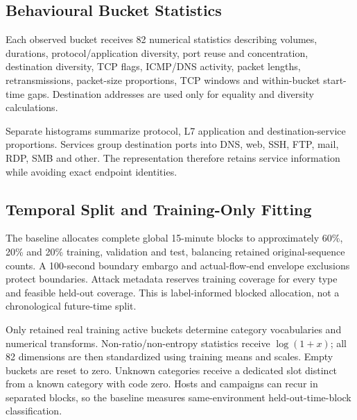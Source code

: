 \documentclass[conference]{IEEEtran}
\begin{document}
\subsection{Behavioural Bucket Statistics}
Each observed bucket receives 82 numerical statistics describing volumes, durations, protocol/application diversity, port reuse and concentration, destination diversity, TCP flags, ICMP/DNS activity, packet lengths, retransmissions, packet-size proportions, TCP windows and within-bucket start-time gaps. Destination addresses are used only for equality and diversity calculations.

Separate histograms summarize protocol, L7 application and destination-service proportions. Services group destination ports into DNS, web, SSH, FTP, mail, RDP, SMB and other. The representation therefore retains service information while avoiding exact endpoint identities.

\subsection{Temporal Split and Training-Only Fitting}
The baseline allocates complete global 15-minute blocks to approximately 60\%, 20\% and 20\% training, validation and test, balancing retained original-sequence counts. A 100-second boundary embargo and actual-flow-end envelope exclusions protect boundaries. Attack metadata reserves training coverage for every type and feasible held-out coverage. This is label-informed blocked allocation, not a chronological future-time split.

Only retained real training active buckets determine category vocabularies and numerical transforms. Non-ratio/non-entropy statistics receive $\log(1+x)$; all 82 dimensions are then standardized using training means and scales. Empty buckets are reset to zero. Unknown categories receive a dedicated slot distinct from a known category with code zero. Hosts and campaigns can recur in separated blocks, so the baseline measures same-environment held-out-time-block classification.
\end{document}
